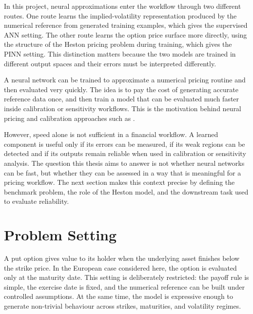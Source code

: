 In this project, neural approximations enter the workflow through two different routes. One route learns the implied-volatility representation produced by the numerical reference from generated training examples, which gives the supervised ANN setting. The other route learns the option price surface more directly, using the structure of the Heston pricing problem during training, which gives the PINN setting. This distinction matters because the two models are trained in different output spaces and their errors must be interpreted differently.

A neural network can be trained to approximate a numerical pricing routine and then evaluated very quickly. 
The idea is to pay the cost of generating accurate reference data once, and then train a model that can be evaluated much faster inside calibration or sensitivity workflows. 
This is the motivation behind neural pricing and calibration approaches such as \cite{liu}.

However, speed alone is not sufficient in a financial workflow. 
A learned component is useful only if its errors can be measured, if its weak regions can be detected and if its outputs remain reliable when used in calibration or sensitivity analysis.
The question this thesis aims to answer is not whether neural networks can be fast, but whether they can be assessed in a way that is meaningful for a pricing workflow. 
The next section makes this context precise by defining the benchmark problem, the role of the Heston model, and the downstream task used to evaluate reliability.


\section{Problem Setting}
A put option gives value to its holder when the underlying asset finishes below the strike price. 
In the European case considered here, the option is evaluated only at the maturity date. 
This setting is deliberately restricted: the payoff rule is simple, the exercise date is fixed, and the numerical reference can be built under controlled assumptions.
At the same time, the model is expressive enough to generate non-trivial behaviour across strikes, maturities, and volatility regimes.

